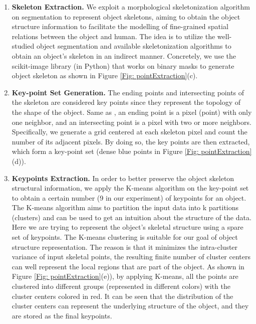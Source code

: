 \documentclass[a4paper, 10pt, conference]{IEEEtran}
\begin{document}
\begin{enumerate}[label=(\roman*)]
    \item \textbf{Skeleton Extraction.} We exploit a morphological skeletonization algorithm \cite{Zhang:skeleton84}  on segmentation to represent object skeletons, aiming to obtain the object structure information to facilitate the modelling of fine-grained spatial relations between the object and human. The idea is to utilize the well-studied object segmentation and available skeletonization algorithms to obtain an object's skeleton in an indirect manner. Concretely, we use the scikit-image library (in Python) that works on binary masks to generate object skeleton as shown in Figure \ref{Fig: pointExtraction}(c).
    
    \item \textbf{Key-point Set Generation.} The ending points and intersecting points of the skeleton are considered key points since they represent the topology of the shape of the object. Same as \cite{keypoints}, an ending point is a pixel (point) with only one neighbor, and an intersecting point is a pixel with two or more neighbors. Specifically, we generate a  grid centered at each skeleton pixel and count the number of its adjacent pixels. By doing so, the key points are then extracted, which form a key-point set (dense blue points in Figure \ref{Fig: pointExtraction}(d)). 
    
    \item \textbf{Keypoints Extraction.} In order to better preserve the object skeleton structural information, we apply the K-means algorithm on the key-point set to obtain a certain number (9 in our experiment) of keypoints for an object. The K-means algorithm aims to partition the input data into k partitions (clusters) and can be used to get an intuition about the structure of the data. Here we are trying to represent the object's skeletal structure using a spare set of keypoints. The K-means clustering is suitable for our goal of object structure representation. The reason is that it minimizes the intra-cluster variance of input skeletal points, the resulting finite number of cluster centers can well represent the local regions that are part of the object. As shown in Figure \ref{Fig: pointExtraction}(e)), by applying K-means, all the points are clustered into different groups (represented in different colors) with the cluster centers colored in red. It can be seen that the distribution of the cluster centers can represent the underlying structure of the object, and they are stored as the final keypoints.
\end{enumerate}
\end{document}
